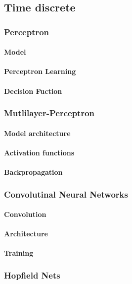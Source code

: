 \subsection{Time discrete}
\subsubsection{Perceptron}
\paragraph{Model}
\paragraph{Perceptron Learning}
\paragraph{Decision Fuction}
\subsubsection{Mutlilayer-Perceptron}
\paragraph{Model architecture}
\paragraph{Activation functions}
\paragraph{Backpropagation}
\subsubsection{Convolutinal Neural Networks}
\paragraph{Convolution}
\paragraph{Architecture}
\paragraph{Training}
\subsubsection{Hopfield Nets}
